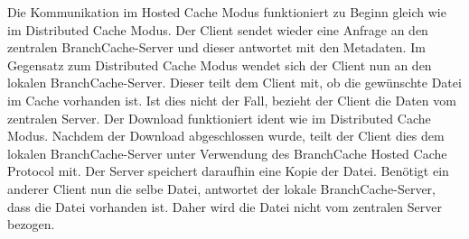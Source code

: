 Die Kommunikation im Hosted Cache Modus funktioniert zu Beginn gleich wie im Distributed Cache Modus. Der Client sendet wieder eine Anfrage an den zentralen BranchCache-Server und dieser antwortet mit den Metadaten. Im Gegensatz zum Distributed Cache Modus wendet sich der Client nun an den lokalen BranchCache-Server. Dieser teilt dem Client mit, ob die gewünschte Datei im Cache vorhanden ist. Ist dies nicht der Fall, bezieht der Client die Daten vom zentralen Server. Der Download funktioniert ident wie im Distributed Cache Modus. Nachdem der Download abgeschlossen wurde, teilt der Client dies dem lokalen BranchCache-Server unter Verwendung des BranchCache Hosted Cache Protocol mit. Der Server speichert daraufhin eine Kopie der Datei. Benötigt ein anderer Client nun die selbe Datei, antwortet der lokale BranchCache-Server, dass die Datei vorhanden ist. Daher wird die Datei nicht vom zentralen Server bezogen.